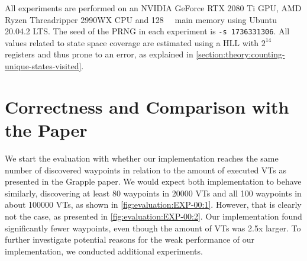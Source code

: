 \documentclass[
fancyheadings, %
%
%
]{stsreprt}
\begin{document}
All experiments are performed on an NVIDIA GeForce RTX 2080 Ti GPU, AMD Ryzen Threadripper 2990WX CPU and \SI{128}{\giga\byte} main memory using Ubuntu 20.04.2 LTS.
The seed of the PRNG in each experiment is \texttt{-s 1736331306}.
All values related to state space coverage are estimated using a HLL with $2^{14}$ registers and thus prone to an error, as explained in \cref{section:theory:counting-unique-states-visited}.

\section{Correctness and Comparison with the Paper}
\label{section:evaluation:correctness-comparison-with-paper}

We start the evaluation with whether our implementation reaches the same number of discovered waypoints in relation to the amount of executed VTs as presented in the Grapple paper.
We would expect both implementation to behave similarly, discovering at least 80 waypoints in \num{20000} VTs and all 100 waypoints in about \num{100000} VTs, as shown in \cref{fig:evaluation:EXP-00:1}.
However, that is clearly not the case, as presented in \cref{fig:evaluation:EXP-00:2}.
Our implementation found significantly fewer waypoints, even though the amount of VTs was 2.5x larger.
To further investigate potential reasons for the weak performance of our implementation, we conducted additional experiments.
\end{document}
